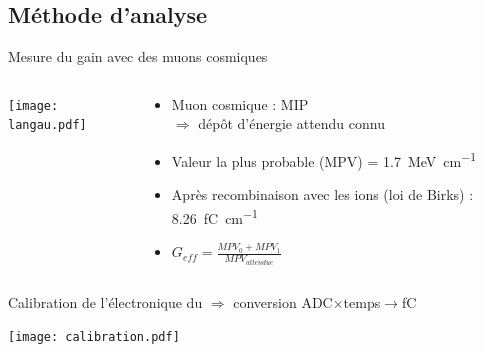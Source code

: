     \subsection{Méthode d'analyse}

    \begin{frame}{Mesure du gain avec des muons cosmiques}
    	\begin{scriptsize}
            \begin{columns}
                \begin{column}{0.6\textwidth}
                    \centering \texttt{[image: langau.pdf]}
                \end{column}\hfill
                \begin{column}{0.4\textwidth}
                    \begin{itemize}
       					\item Muon cosmique : MIP \\ $\Rightarrow$ dépôt d'énergie attendu connu
       					\item Valeur la plus probable (MPV) = \SI{1.7}{\mega\electronvolt\per\centi\meter}
       					\item Après recombinaison avec les ions (loi de Birks) : \SI{8.26}{\femto\coulomb\per\centi\meter}
       					\item $G_{eff}=\frac{MPV_0 + MPV_1}{MPV_{attendue}}$
       				\end{itemize}
                \end{column}
            \end{columns}
            \vspace{0.2cm}
            Calibration de l'électronique du \TOO{} $\Rightarrow$ conversion ADC$\times$temps$\to$\si{\femto\coulomb}
            \begin{center} \texttt{[image: calibration.pdf]} \end{center}
	    \end{scriptsize}
    \end{frame}

